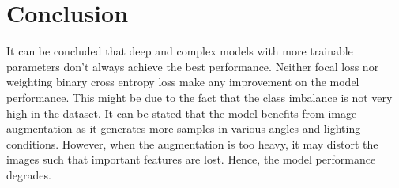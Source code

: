 \documentclass[conference]{IEEEtran}
\begin{document}
\section{Conclusion}

It can be concluded that deep and complex models with more trainable parameters 
don't always achieve the best performance. Neither focal loss nor weighting 
binary cross entropy loss make any improvement on the model performance. 
This might be due to the fact that the class imbalance is not very high in the dataset.
It can be stated that the model benefits from image augmentation as it generates
more samples in various angles and lighting conditions. However, when the augmentation 
is too heavy, it may distort the images such that important features are lost. Hence,
the model performance degrades.

\clearpage



\end{document}
